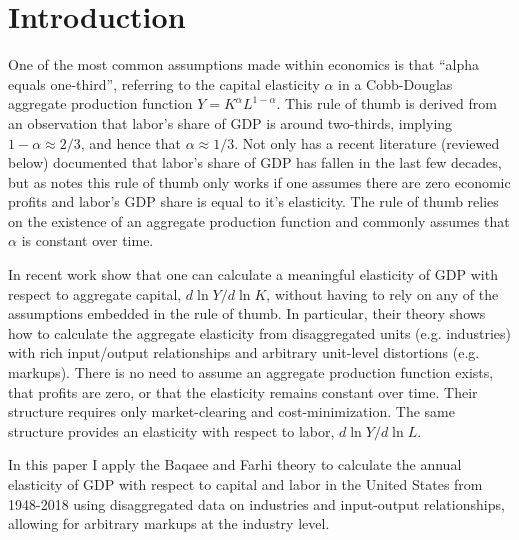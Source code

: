 \documentclass[11pt]{article}
\begin{document}
\section{Introduction}
\onehalfspacing One of the most common assumptions made within economics is that ``alpha equals one-third'', referring to the capital elasticity $\alpha$ in a Cobb-Douglas aggregate production function $Y = K^{\alpha}L^{1-\alpha}$. This rule of thumb is derived from an observation that labor's share of GDP is around two-thirds, implying $1-\alpha \approx 2/3$, and hence that $\alpha \approx 1/3$. Not only has a recent literature (reviewed below) documented that labor's share of GDP has fallen in the last few decades, but as \cite{hall1988,hall1990} notes this rule of thumb only works if one assumes there are zero economic profits and labor's GDP share is equal to it's elasticity. The rule of thumb relies on the existence of an aggregate production function and commonly assumes that $\alpha$ is constant over time.

In recent work \cite{bfshortnote,bfprodge} show that one can calculate a meaningful elasticity of GDP with respect to aggregate capital, $d \ln Y/ d \ln K$, without having to rely on any of the assumptions embedded in the rule of thumb. In particular, their theory shows how to calculate the aggregate elasticity from disaggregated units (e.g. industries) with rich input/output relationships and arbitrary unit-level distortions (e.g. markups). There is no need to assume an aggregate production function exists, that profits are zero, or that the elasticity remains constant over time. Their structure requires only market-clearing and cost-minimization. The same structure provides an elasticity with respect to labor, $d \ln Y/ d \ln L$.

In this paper I apply the Baqaee and Farhi theory to calculate the annual elasticity of GDP  with respect to capital and labor in the United States from 1948-2018 using disaggregated data on industries and input-output relationships, allowing for arbitrary markups at the industry level.
\end{document}
